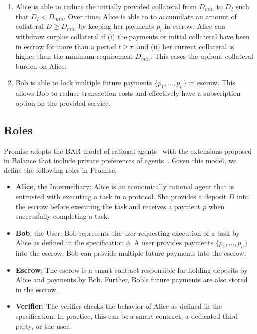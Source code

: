 \documentclass[runningheads]{llncs}
\newcommand{\sys}{Promise\xspace}
\begin{document}
\begin{enumerate}
    \item Alice is able to reduce the initially provided collateral from $D_{min}$ to $D_I$ such that $D_I < D_{min}$. Over time, Alice is able to to accumulate an amount of collateral $D \geq D_{min}$ by keeping her payments $p_i$ in escrow. Alice can withdraw surplus collateral if (i) the payments or initial collateral have been in escrow for more than a period $t \geq \tau$, and (ii) her current collateral is higher than the minimum requirement $D_{min}$. This eases the upfront collateral burden on Alice.
    \item Bob is able to lock multiple future payments $\{p_1, ..., p_n\}$ in escrow. This allows Bob to reduce transaction costs and effectively have a subscription option on the provided service.
\end{enumerate}

\subsection{Roles}

Promise adopts the BAR model of rational agents~\cite{aiyer2005bar} with the extensions proposed in Balance that include private preferences of agents~\cite{Harz2019Balance}.
Given this model, we define the following roles in \sys.

\begin{itemize}
    \item \textbf{Alice}, the Intermediary: Alice is an economically rational agent that is entrusted with executing a task in a protocol. She provides a deposit $D$ into the escrow before executing the task and receives a payment $p$ when successfully completing a task.
    \item \textbf{Bob}, the User: Bob represents the user requesting execution of a task by Alice as defined in the specification $\phi$. A user provides payments $\{p_1, ..., p_n\}$ into the escrow. Bob can provide multiple future payments into the escrow.
    \item \textbf{Escrow}: The escrow is a smart contract responsible for holding deposits by Alice and payments by Bob. Further, Bob's future payments are also stored in the escrow.
    \item \textbf{Verifier}: The verifier checks the behavior of Alice as defined in the specification. In practice, this can be a smart contract, a dedicated third party, or the user.
\end{itemize}
\end{document}
